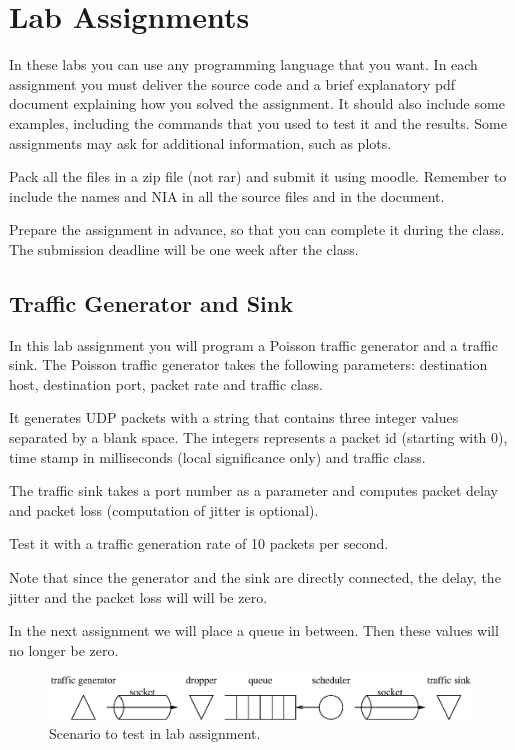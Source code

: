 \chapter{Lab Assignments}

In these labs you can use any programming language that you want. 
In each assignment you must deliver the source code and a brief explanatory pdf document explaining how you solved the assignment.
It should also include some examples, including the commands that you used to test it and the results.
Some assignments may ask for additional information, such as plots.

Pack all the files in a zip file (not rar) and submit it using moodle.
Remember to include the names and NIA in all the source files and in the document.

Prepare the assignment in advance, so that you can complete it during the class.
The submission deadline will be one week after the class.

\section{Traffic Generator and Sink}

In this lab assignment you will program a Poisson traffic generator and a traffic sink.
The Poisson traffic generator takes the following parameters:
destination host, destination port, packet rate and traffic class.

It generates UDP packets with a string that contains three integer values separated by a blank space. The integers represents a packet id (starting with 0), time stamp in milliseconds (local significance only) and traffic class.

The traffic sink takes a port number as a parameter and computes packet delay and packet loss (computation of jitter is optional).

Test it with a traffic generation rate of 10 packets per second.

Note that since the generator and the sink are directly connected, the delay, the jitter and the packet loss will will be zero.

In the next assignment we will place a queue in between.
Then these values will no longer be zero.

\begin{figure}[!h]
\centering
\includegraphics[width=\linewidth]{figures/scenario.eps}
\caption{Scenario to test in lab assignment.}
\label{fig:scenario}
\end{figure}

